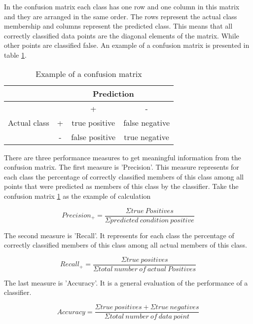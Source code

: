 In the confusion matrix each class has one row and one column in this matrix and they are arranged in the same order.
%
The rows represent the actual class membership and columns represent the predicted class.
%
This means that all correctly classified data points are the diagonal elements of the matrix.
%
While other points are classified false.
%
An example of a confusion matrix is presented in table \ref{tbl:confusion_matrix}.

\begin{table}[]
\centering
\caption{Example of a confusion matrix}
\label{tbl:confusion_matrix}
\begin{tabular}{cccc}
\hline
 & \multicolumn{3}{c}{Prediction} \\ \hline
 &  & + & - \\
Actual class & + & true positive & false negative \\
 & - & false positive & true negative \\ \hline
\end{tabular}
\end{table}

There are three performance measures to get meaningful information from the confusion matrix.
%
The first measure is 'Precision'.
%
This measure represents for each class the percentage of correctly classified members of this class among all points that were predicted as members of this class by the classifier.
%
Take the confusion matrix \ref{tbl:confusion_matrix} as the example of calculation

\begin{equation}
    Precision_{+} = \frac{\Sigma true~Positives}{\Sigma predicted~condition~positive}
\end{equation}

The second measure is 'Recall'.
%
It represents for each class the percentage of correctly classified members of this class among all actual members of this class.

\begin{equation}
    Recall_{+} = \frac{\Sigma true~positives}{\Sigma total~number~of~actual~Positives}
\end{equation}

The last measure is 'Accuracy'.
%
It is a general evaluation of the performance of a classifier.

\begin{equation}
    Accuracy = \frac{\Sigma true~positives + \Sigma true~negatives}{\Sigma total~number~of~data~point}
\end{equation}

